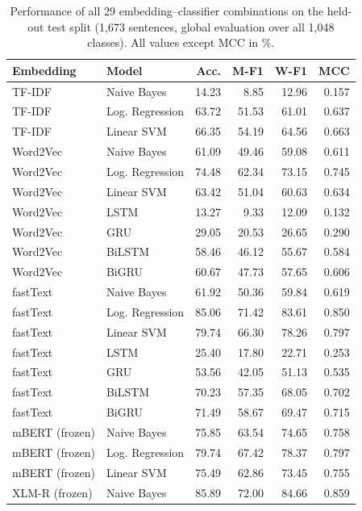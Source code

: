 \documentclass[conference]{IEEEtran}
\begin{document}
\begin{table}[tbp]
\caption{Performance of all 29 embedding--classifier combinations on the held-out test split (1,673 sentences, global evaluation over all 1,048 classes). All values except MCC in \%.}
\label{tab:main}
\centering
\scriptsize
\setlength{\tabcolsep}{3.4pt}
\begin{tabular}{@{}llrrrr@{}}
\toprule
\textbf{Embedding} & \textbf{Model} & \textbf{Acc.} & \textbf{M-F1} & \textbf{W-F1} & \textbf{MCC} \\
\midrule
TF-IDF & Naive Bayes & 14.23 & 8.85 & 12.96 & 0.157 \\
TF-IDF & Log. Regression & 63.72 & 51.53 & 61.01 & 0.637 \\
TF-IDF & Linear SVM & 66.35 & 54.19 & 64.56 & 0.663 \\
\midrule
Word2Vec & Naive Bayes & 61.09 & 49.46 & 59.08 & 0.611 \\
Word2Vec & Log. Regression & 74.48 & 62.34 & 73.15 & 0.745 \\
Word2Vec & Linear SVM & 63.42 & 51.04 & 60.63 & 0.634 \\
Word2Vec & LSTM & 13.27 & 9.33 & 12.09 & 0.132 \\
Word2Vec & GRU & 29.05 & 20.53 & 26.65 & 0.290 \\
Word2Vec & BiLSTM & 58.46 & 46.12 & 55.67 & 0.584 \\
Word2Vec & BiGRU & 60.67 & 47.73 & 57.65 & 0.606 \\
\midrule
fastText & Naive Bayes & 61.92 & 50.36 & 59.84 & 0.619 \\
fastText & Log. Regression & 85.06 & 71.42 & 83.61 & 0.850 \\
fastText & Linear SVM & 79.74 & 66.30 & 78.26 & 0.797 \\
fastText & LSTM & 25.40 & 17.80 & 22.71 & 0.253 \\
fastText & GRU & 53.56 & 42.05 & 51.13 & 0.535 \\
fastText & BiLSTM & 70.23 & 57.35 & 68.05 & 0.702 \\
fastText & BiGRU & 71.49 & 58.67 & 69.47 & 0.715 \\
\midrule
mBERT (frozen) & Naive Bayes & 75.85 & 63.54 & 74.65 & 0.758 \\
mBERT (frozen) & Log. Regression & 79.74 & 67.42 & 78.37 & 0.797 \\
mBERT (frozen) & Linear SVM & 75.49 & 62.86 & 73.45 & 0.755 \\
\midrule
XLM-R (frozen) & Naive Bayes & 85.89 & 72.00 & 84.66 & 0.859 \\

\end{tabular}
\end{table}
\end{document}

